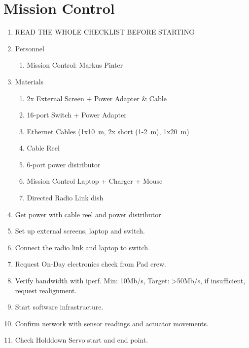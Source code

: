 \newpage
\setcounter{page}{1}
\lfoot{\thepage / \pageref{end_section_lead}}
\section*{Mission Control}


\begin{enumerate}[label=P\arabic*.]
    \item READ THE WHOLE CHECKLIST BEFORE STARTING \checkbox
    
    \item \label{mc_personnel} Personnel
        \begin{enumerate}[label*=\arabic*.]
            \item Mission Control: Markus Pinter\leftcheckbox
        \end{enumerate} 
    \item \label{mc_materials} Materials
        \begin{enumerate}[label*=\arabic*.]
            \item 2x External Screen + Power Adapter \& Cable\leftcheckbox
            \item 16-port Switch + Power Adapter\leftcheckbox
            \item Ethernet Cables (1x\SI{10}{\meter}, 2x short (1-\SI{2}{\meter}), 1x\SI{20}{\meter})\leftcheckbox
            \item Cable Reel\leftcheckbox
            \item 6-port power distributor\leftcheckbox
            \item Mission Control Laptop + Charger + Mouse\leftcheckbox
            \item Directed Radio Link dish\leftcheckbox
        \end{enumerate} 
        
    \item \label{mc_prep_start} Get power with cable reel and power distributor\checkbox
    \item Set up external screens, laptop and switch.\checkbox
    \item Connect the radio link and laptop to switch.\checkbox
    \item Request On-Day electronics check from Pad crew.\checkbox
    \item Verify bandwidth with iperf. Min: 10Mb/s, Target: >50Mb/s, if insufficient, request realignment.\leftcheckbox
    \item Start software infrastructure.\checkbox
    \item Confirm network with sensor readings and actuator movements.\checkbox
    \item \label{mc_prep_end} Check Holddown Servo start and end point.\checkbox
\end{enumerate}